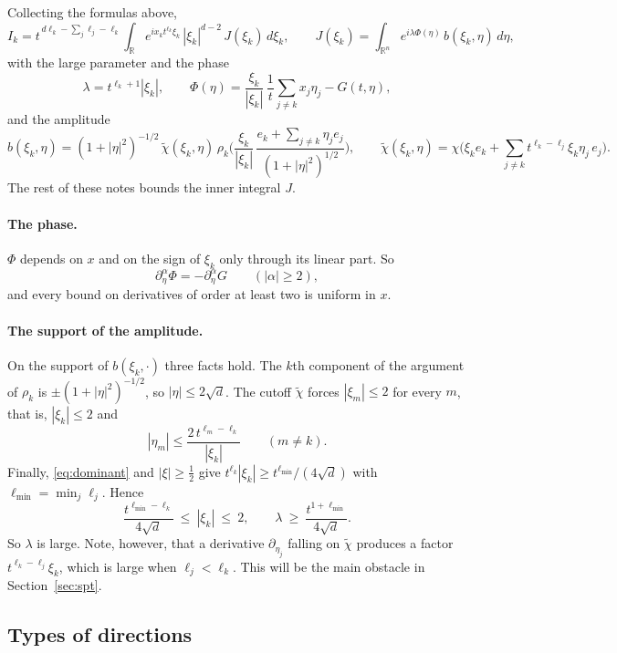 \documentclass[11pt]{article}
\theoremstyle{remark}
\newcommand{\R}{\mathbb{R}}
\begin{document}
Collecting the formulas above,
\[
I_k=t^{\,d\ell_k-\sum_j\ell_j-\ell_k}\int_{\R}e^{ix_kt^{\ell_k}\xi_k}\,|\xi_k|^{d-2}\,
J(\xi_k)\,d\xi_k ,
\qquad
J(\xi_k)=\int_{\R^n}e^{i\lambda\Phi(\eta)}\,b(\xi_k,\eta)\,d\eta ,
\]
with the large parameter and the phase
\[
\lambda=t^{\ell_k+1}|\xi_k| ,
\qquad
\Phi(\eta)=\frac{\xi_k}{|\xi_k|}\,\frac1t\sum_{j\ne k}x_j\eta_j-G(t,\eta),
\]
and the amplitude
\[
b(\xi_k,\eta)=(1+|\eta|^2)^{-1/2}\,\tilde\chi(\xi_k,\eta)\,
\rho_k\Big(\frac{\xi_k}{|\xi_k|}\,\frac{e_k+\sum_{j\ne k}\eta_je_j}{(1+|\eta|^2)^{1/2}}\Big),
\qquad
\tilde\chi(\xi_k,\eta)=\chi\Big(\xi_ke_k+\sum_{j\ne k}t^{\ell_k-\ell_j}\xi_k\eta_j\,e_j\Big).
\]
The rest of these notes bounds the inner integral $J$.

\paragraph{The phase.} $\Phi$ depends on $x$ and on the sign of $\xi_k$ only through
its linear part. So
\begin{equation}\label{eq:phase-deriv}
\partial_\eta^\alpha\Phi=-\partial_\eta^\alpha G\qquad(|\alpha|\ge2),
\end{equation}
and every bound on derivatives of order at least two is uniform in $x$.

\paragraph{The support of the amplitude.} On the support of $b(\xi_k,\cdot)$ three
facts hold. The $k$th component of the argument of $\rho_k$ is
$\pm(1+|\eta|^2)^{-1/2}$, so $|\eta|\le2\sqrt d$. The cutoff $\tilde\chi$ forces
$|\xi_m|\le2$ for every $m$, that is, $|\xi_k|\le2$ and
\begin{equation}\label{eq:support}
|\eta_m|\le\frac{2\,t^{\ell_m-\ell_k}}{|\xi_k|}\qquad(m\ne k).
\end{equation}
Finally, \eqref{eq:dominant} and $|\xi|\ge\frac12$ give
$t^{\ell_k}|\xi_k|\ge t^{\ell_{\min}}/(4\sqrt d)$ with $\ell_{\min}=\min_j\ell_j$.
Hence
\[
\frac{t^{\ell_{\min}-\ell_k}}{4\sqrt d}\ \le\ |\xi_k|\ \le\ 2,
\qquad
\lambda\ \ge\ \frac{t^{1+\ell_{\min}}}{4\sqrt d}.
\]
So $\lambda$ is large. Note, however, that a derivative $\partial_{\eta_j}$ falling
on $\tilde\chi$ produces a factor $t^{\ell_k-\ell_j}\xi_k$, which is large when
$\ell_j<\ell_k$. This will be the main obstacle in Section~\ref{sec:spt}.

\subsection{Types of directions}\label{sec:types}
\end{document}
